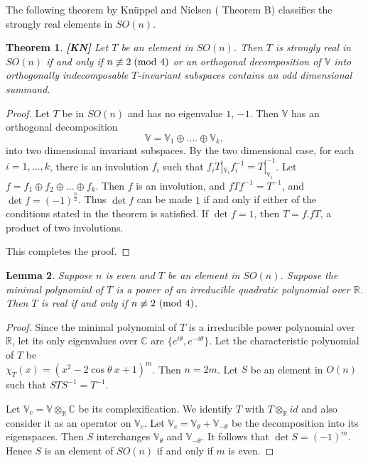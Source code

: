 \documentclass[11pt]{amsart}
\newtheorem{theorem}{Theorem}[section]
\newtheorem{lemma}[theorem]{Lemma}
\theoremstyle{definition}
\theoremstyle{remark}
\numberwithin{equation}{section}
\theoremstyle{plain}
\begin{document}
The following theorem by Kn\"uppel and Nielsen  ( \cite{kn} Theorem B)  classifies the strongly real elements in $SO(n)$. 

\begin{theorem}\label{kn} {\bf [KN]}  Let $T$ be an element in $SO(n)$. Then $T$ is strongly real in $SO(n)$ if and only if $n \not \equiv 2\;(\hbox{mod }4)$ or an orthogonal decomposition of ${\mathbb V}$ into orthogonally indecomposable $T$-invariant subspaces contains an odd dimensional summand. 
\end{theorem}
\begin{proof}
Let $T$ be in $SO(n)$ and has no eigenvalue $1$, $-1$. Then ${\mathbb V}$ has an orthogonal decomposition 
$${\mathbb V}={\mathbb V}_1 \oplus .... \oplus {\mathbb V}_k,$$
into two dimensional invariant subspaces.  By the two dimensional case, for each $i=1,...,k$, there is an involution $f_i$ such that $f_i T|_{{\mathbb V}_i} f_i^{-1}=T|_{{\mathbb V}_i}^{-1}$. Let $f=f_1 \oplus f_2 \oplus ... \oplus f_k$. Then $f$ is an involution, and $fTf^{-1}=T^{-1}$, and $\det f=(-1)^{\frac{n}{2}}$. Thus $\det f$ can be made $1$ if and only if either of the conditions stated in the theorem is satisfied.  If $\det f=1$, then $T=f.fT$, a product of two involutions. 

This completes the proof.  
\end{proof}
\begin{lemma}\label{lem1}
Suppose $n$ is even and $T$ be an element in $SO(n)$. Suppose the minimal polynomial of $T$ is a power of an irreducible quadratic polynomial over ${\mathbb R}$. Then $T$ is real if and only if $n \not \equiv 2 \  (\hbox{mod }4)$.  
\end{lemma}

\begin{proof}
Since the minimal polynomial of $T$ is a irreducible power polynomial over ${\mathbb R}$, let its only eigenvalues over ${\mathbb C}$ are $\{e^{i \theta}, e^{-i \theta}\}$. Let the characteristic polynomial of $T$ be 
\\ $\chi_T(x)=(x^2 -2 \cos \theta \ x +1)^m$. Then $n=2m$. Let $S$ be an element in $O(n)$ such that $STS^{-1}=T^{-1}$. 

Let ${\mathbb V}_c = {\mathbb V} \otimes_{\mathbb R} {\mathbb C}$  be its complexification. We identify $T$ with $T\otimes_{\mathbb R} id$ and also consider it as an operator on ${\mathbb V}_c$. Let ${\mathbb V}_c ={\mathbb V}_{\theta} + {\mathbb V}_{-\theta}$ be the decomposition into its eigenspaces. Then $S$ interchanges ${\mathbb V}_{\theta}$ and ${\mathbb V}_{-\theta}$. It follows that $\det S=(-1)^m$. Hence $S$ is an element of $SO(n)$ if and only if $m$ is even.  
\end{proof}
\end{document}
